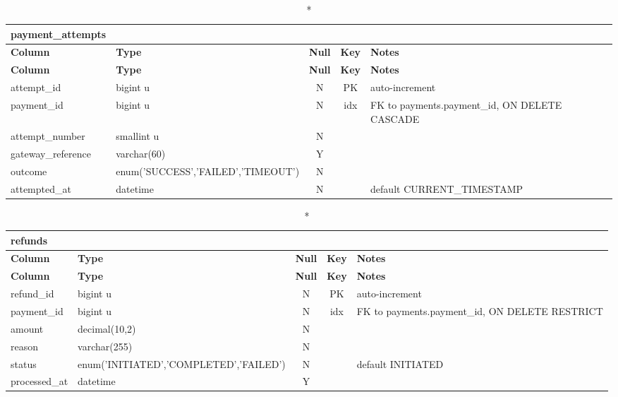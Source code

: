 \vspace{-0.4em}
\begin{longtable}{@{}p{3.4cm}p{2.9cm}c c p{5.6cm}@{}}
\caption*{\textbf{payment\_\allowbreak{}attempts}}\\
\toprule \textbf{Column} & \textbf{Type} & \textbf{Null} & \textbf{Key} & \textbf{Notes} \\ \midrule \endfirsthead
\toprule \textbf{Column} & \textbf{Type} & \textbf{Null} & \textbf{Key} & \textbf{Notes} \\ \midrule \endhead
\bottomrule \endlastfoot
attempt\_\allowbreak{}id & bigint u & N & PK & auto-increment \\
payment\_\allowbreak{}id & bigint u & N & idx & FK to payments.payment\_\allowbreak{}id, ON DELETE CASCADE \\
attempt\_\allowbreak{}number & smallint u & N &  &  \\
gateway\_\allowbreak{}reference & varchar(60) & Y &  &  \\
outcome & enum('SUCCESS',\allowbreak{}'FAILED',\allowbreak{}'TIMEOUT') & N &  &  \\
attempted\_\allowbreak{}at & datetime & N &  & default CURRENT\_\allowbreak{}TIMESTAMP \\
\end{longtable}
\vspace{-0.4em}
\begin{longtable}{@{}p{3.4cm}p{2.9cm}c c p{5.6cm}@{}}
\caption*{\textbf{refunds}}\\
\toprule \textbf{Column} & \textbf{Type} & \textbf{Null} & \textbf{Key} & \textbf{Notes} \\ \midrule \endfirsthead
\toprule \textbf{Column} & \textbf{Type} & \textbf{Null} & \textbf{Key} & \textbf{Notes} \\ \midrule \endhead
\bottomrule \endlastfoot
refund\_\allowbreak{}id & bigint u & N & PK & auto-increment \\
payment\_\allowbreak{}id & bigint u & N & idx & FK to payments.payment\_\allowbreak{}id, ON DELETE RESTRICT \\
amount & decimal(10,2) & N &  &  \\
reason & varchar(255) & N &  &  \\
status & enum('INITIATED',\allowbreak{}'COMPLETED',\allowbreak{}'FAILED') & N &  & default INITIATED \\
processed\_\allowbreak{}at & datetime & Y &  &  \\
\end{longtable}
\vspace{-0.4em}

